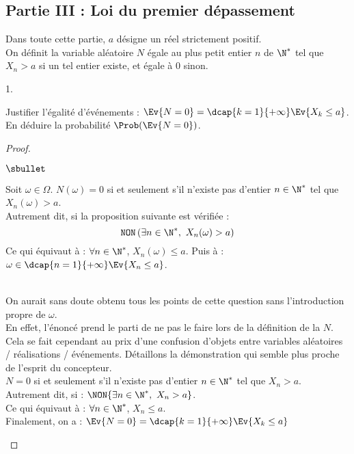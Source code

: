 \documentclass[11pt]{article}%
\begin{document}
 
\subsection*{Partie III : Loi du premier dépassement}

\noindent
Dans toute cette partie, $a$ désigne un réel strictement positif.\\
On définit la variable aléatoire $N$ égale au plus petit entier $n$ de 
$\N^*$ tel que $X_n>a$ si un tel entier existe, et égale à 0 
sinon.~\\[-.6cm]

\begin{noliste}{1.}
 \setlength{\itemsep}{4mm}
 \setcounter{enumi}{6}
 \item Justifier l'égalité d'événements : $\Ev{N=0} = 
 \dcap{k=1}{+\infty} \Ev{X_k\leq a}$. En déduire la probabilité 
 $\Prob(\Ev{N=0})$.
 
 \begin{proof}~
  \begin{noliste}{$\sbullet$}
   \item Soit $\omega \in \Omega$.
   $N(\omega)=0$ si et seulement s'il n'existe pas d'entier $n\in\N^*$
   tel que $X_n(\omega)>a$.\\
   Autrement dit, si la proposition suivante est vérifiée :
   \[
    \texttt{NON}\left( \exists n\in \N^*, \ X_n(\omega)>a\right)
   \]
   Ce qui équivaut à : $\forall n\in \N^*$, $X_n(\omega) \leq a$.
   Puis à : $\omega \in \dcap{n=1}{+\infty} \Ev{X_n \leq a}$.
  

  \newpage

  
  \begin{remark}~\\
    On aurait sans doute obtenu tous les points de cette question sans
    l'introduction propre de $\omega$.\\
    En effet, l'énoncé prend le parti de ne pas le faire lors de la
    définition de la \var $N$.\\
    Cela se fait cependant au prix d'une confusion d'objets entre
    variables aléatoires / réalisations / événements. Détaillons la
    démonstration qui semble plus proche de l'esprit du concepteur.\\[.2cm]
    $N=0$ si et seulement s'il n'existe pas d'entier $n\in\N^*$
    tel que $X_n>a$.\\
    Autrement dit, si : $\NON{ \exists n\in \N^*, \ X_n>a}$.\\
    Ce qui équivaut à : $\forall n\in \N^*$, $X_n \leq a$.\\
    Finalement, on a : $\Ev{N=0}= \dcap{k=1}{+\infty} \Ev{X_k \leq a}$
  \end{remark}
  

\end{noliste}
\end{proof}
\end{noliste}
\end{document}
